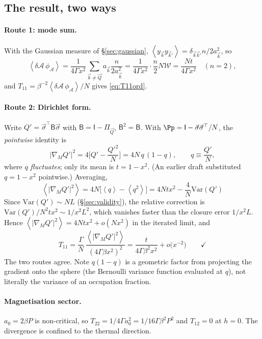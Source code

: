 \documentclass[11pt,a4paper]{article}
\newcommand{\bk}{\vec k}
\newcommand{\bQ}{\vec Q}
\newcommand{\avg}[1]{\left\langle #1 \right\rangle}
\newcommand{\Wc}{\mathcal{W}}
\newcommand{\Ac}{\mathcal{A}}
\newcommand{\Tm}{T}
\newcommand{\bk}{\vec k}
\newcommand{\bQ}{\vec Q}
\newcommand{\bs}{\vec\sigma}
\newcommand{\avg}[1]{\left\langle #1 \right\rangle}
\newcommand{\Wc}{\mathcal{W}}
\begin{document}
\subsection{The result, two ways}
\paragraph{Route 1: mode sum.} With the Gaussian measure of \S\ref{sec:gaussian},
$\avg{y_{\bk}y_{\bk'}}=\delta_{\bk\bk'}n/2a_{\bk}^2$, so
\begin{equation}
  \avg{\delta\Ac\,\phi_{\Ac}}=\frac{1}{4\Gamma x^{2}}\sum_{\bk\neq\bQ}a_{\bk}\frac{n}{2a_{\bk}^{2}}
   =\frac{1}{4\Gamma x^{2}}\cdot\frac n2N\Wc=\frac{Nt}{4\Gamma x^{2}}\quad(n=2),
\end{equation}
and $\Tm_{11}=\beta^{-2}\avg{\delta\Ac\,\phi_{\Ac}}/N$ gives \eqref{eq:T11ord}.

\paragraph{Route 2: Dirichlet form.} Write $Q'=\bs^\top\mathsf B\bs$ with
$\mathsf B=\mathsf I-\Pi_{\bQ}$, $\mathsf B^2=\mathsf B$. With $\Pp=\mathsf I-\bs\bs^\top/N$,
the \emph{pointwise} identity is
\begin{equation}
  |\nabla_M Q'|^{2}=4\Big[Q'-\frac{Q'^{2}}{N}\Big]=4N\,q\,(1-q),
  \qquad q\equiv\frac{Q'}{N} ,
\end{equation}
where $q$ \emph{fluctuates}; only its mean is $t=1-x^2$. (An earlier draft substituted
$q=1-x^2$ pointwise.) Averaging,
\begin{equation}
  \boxed{\ \avg{|\nabla_MQ'|^{2}}=4N\big[\avg q-\avg{q^2}\big]
   =4Ntx^{2}-\frac{4}{N}\mathrm{Var}(Q')\ }
\end{equation}
Since $\mathrm{Var}(Q')\sim NL$ (\S\ref{sec:validity}), the relative correction is
$\mathrm{Var}(Q')/N^2tx^2\sim1/x^2L^2$, which vanishes faster than the closure error
$1/x^2L$. Hence $\avg{|\nabla_MQ'|^2}=4Ntx^2+o(Nx^2)$ in the iterated limit, and
\begin{equation}
  \Tm_{11}=\frac{\Gamma}{N}\,\frac{\avg{|\nabla_MQ'|^{2}}}{(4\Gamma\beta x^{2})^{2}}
   =\frac{t}{4\Gamma\beta^{2}x^{2}}+o\big(x^{-2}\big) \qquad\checkmark
\end{equation}
The two routes agree. Note $q(1-q)$ is a geometric factor from projecting the gradient onto
the sphere (the Bernoulli variance function evaluated at $q$), not literally the variance of
an occupation fraction.

\paragraph{Magnetisation sector.} $a_0=2\beta P$ is non-critical, so
$\Tm_{22}=1/4\Gamma a_0^2=1/16\Gamma\beta^2P^2$ and $\Tm_{12}=0$ at $h=0$. The divergence is
confined to the thermal direction.
\end{document}
